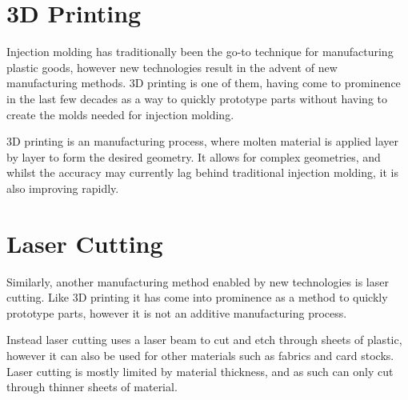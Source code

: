 
\section{3D Printing}

Injection molding has traditionally been the go-to technique for manufacturing plastic goods, however new technologies result in the advent of new manufacturing methods. 3D printing is one of them, having come to prominence in the last few decades as a way to quickly prototype parts without having to create the molds needed for injection molding.

3D printing is an  manufacturing process, where molten material is applied layer by layer to form the desired geometry. It allows for complex geometries, and whilst the accuracy may currently lag behind traditional injection molding, it is also improving rapidly.


\section{Laser Cutting}

Similarly, another manufacturing method enabled by new technologies is laser cutting. Like 3D printing it has come into prominence as a method to quickly prototype parts, however it is not an additive manufacturing process.

Instead laser cutting uses a laser beam to cut and etch through sheets of plastic, however it can also be used for other materials such as fabrics and card stocks. Laser cutting is mostly limited by material thickness, and as such can only cut through thinner sheets of material.

